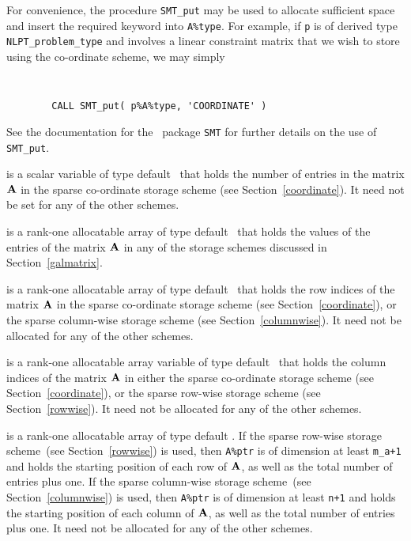 \documentclass{galahad}
\begin{document}
\begin{description}
\begin{description}
For convenience, the procedure {\tt SMT\_put}
may be used to allocate sufficient space and insert the required keyword
into {\tt A\%type}.
For example, if {\tt p} is of derived type {\tt NLPT\_problem\_type}
and involves a linear constraint matrix that we wish to store using the co-ordinate scheme,
we may simply
{\tt
\begin{verbatim}
        CALL SMT_put( p%A%type, 'COORDINATE' )
\end{verbatim}
}
\noindent
See the documentation for the \galahad\ package {\tt SMT}
for further details on the use of {\tt SMT\_put}.

 is a scalar variable of type default \integer\ that holds
the number of entries in the matrix ${\mathbf{A}}$ in the sparse co-ordinate
storage scheme (see Section~\ref{coordinate}).  It need not be set for
any of the other schemes.

 is a rank-one allocatable array of type default \realdp\ that holds
the values of the entries of the matrix ${\mathbf{A}}$ in any of the
storage schemes discussed in Section~\ref{galmatrix}.

 is a rank-one allocatable array of type default \integer\
that holds the row indices of the matrix ${\mathbf{A}}$ in the sparse
co-ordinate storage scheme (see Section~\ref{coordinate}), or the
sparse column-wise storage scheme (see Section~\ref{columnwise}).  It
need not be allocated for any of the other schemes.

 is a rank-one allocatable array variable of type default
\integer\ that holds the column indices of the matrix ${\mathbf{A}}$ in
either the sparse co-ordinate storage scheme (see Section~\ref{coordinate}), or the
sparse row-wise storage scheme (see Section~\ref{rowwise}).  It need
not be allocated for any of the other schemes.

 is a rank-one allocatable array of type default \integer.
If the sparse row-wise storage scheme~(see Section~\ref{rowwise}) is used,
then {\tt A\%ptr} is of dimension at least {\tt m\_a+1} and holds the
starting position of each row of ${\mathbf{A}}$, as well as the total number
of entries plus one.  If the sparse column-wise storage scheme~(see
Section~\ref{columnwise}) is used, then {\tt A\%ptr} is of dimension
at least {\tt n+1} and holds the starting position of each column of ${\mathbf{A}}$, as well as
the total number of entries plus one.  It need not be allocated for
any of the other schemes.


\end{description}
\end{description}
\end{document}
